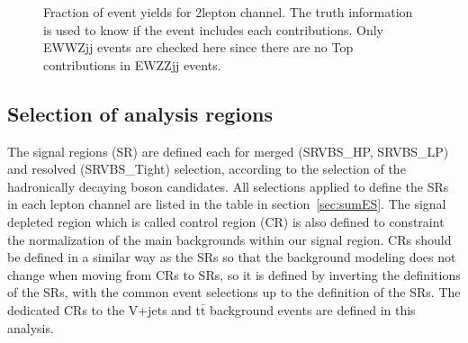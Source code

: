 \begin{figure}[H]
    \centering
        \caption{Fraction of event yields for 2lepton channel. The truth information is used to know if the event includes each contributions. Only EWWZjj events are checked here since there are no Top contributions in EWZZjj events.}
        \label{fig:TruthTop2LepPurity}
\end{figure}

\subsection{Selection of analysis regions}
The signal regions (SR) are defined each for merged (SRVBS\_HP, SRVBS\_LP) and resolved (SRVBS\_Tight) selection, according to the selection of the hadronically decaying boson candidates. All selections applied to define the SRs in each lepton channel are listed in the table in section~\ref{sec:sumES}.
The signal depleted region which is called control region (CR) is also defined to constraint the normalization of the main backgrounds within our signal region. 
CRs should be defined in a similar way as the SRs so that the background modeling does not change when moving from CRs to SRs, so it is defined by inverting the definitions of the SRs, with the common event selections up to the definition of the SRs.
The dedicated CRs to the V+jets and t$\bar{\mathrm{t}}$ background events are defined in this analysis. \\ \\

